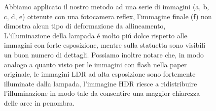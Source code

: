 \documentclass[10pt,journal,cspaper,compsoc]{IEEEtran}
\begin{document}
\begin{figure}[ht]
    \caption[Commento Reflex.]{
        Abbiamo applicato il nostro metodo ad una serie di immagini (a, b, c, d, e) ottenute con una fotocamera reflex,
        l'immagine finale (f) non dimostra alcun tipo di deformazione da allineamento, L'illuminazione della lampada 
        é molto piú dolce rispetto alle immagini con forte esposizione, mentre sulla statuetta sono visibili un buon 
        numero di dettagli. Possiamo inoltre notare che, in modo analogo a quanto visto per le immagini con flash nella 
        paper originale\cite{stanford:exposure_fusion}, le immagini LDR ad alta esposizione sono fortemente illuminate 
        dalla lampada, l'immagine HDR riesce a ridistribuire l'illuminazione in modo tale da consentire una maggior 
        chiarezza delle aree in penombra.}\label{fig:fusion}

\end{figure}
\end{document}
